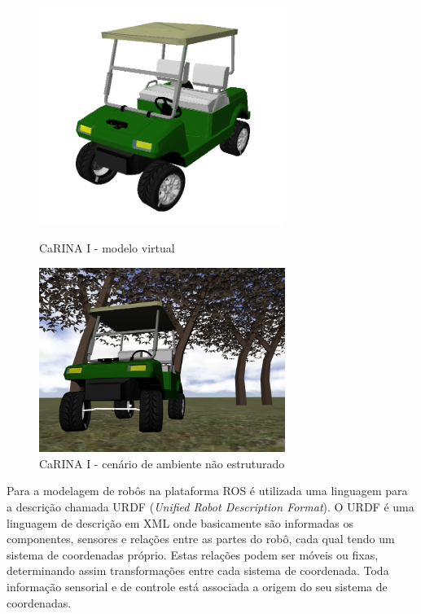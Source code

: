 \documentclass{article}
\begin{document}
\begin{figure}[ht]
	\begin{minipage}[b]{0.4\linewidth}
	    \centering
	    \includegraphics[width=8cm]{../images/carina_rviz_fundo_branco_sem_grid.png}
	 	\caption{CaRINA I - modelo virtual}
	 	\label{fig:model}
	\end{minipage}
	\hspace{1cm}
	\begin{minipage}[b]{0.4\linewidth}
	    \centering
	    \includegraphics[width=8cm]{../images/carina_gazebo_frente_fundo.png}
	 	\caption{CaRINA I - cenário de ambiente não estruturado}
	 	\label{fig:gazebo}
	\end{minipage}
\end{figure}

Para a modelagem de robôs na plataforma ROS é utilizada uma linguagem para a
descrição chamada URDF (\textit{Unified Robot Description Format}). O URDF é
uma linguagem de descrição em XML onde basicamente são informadas os componentes,
sensores e relações entre as partes do robô, cada qual tendo um sistema de
coordenadas próprio. Estas relações podem ser móveis ou fixas, determinando
assim transformações entre cada sistema de coordenada. Toda informação sensorial
e de controle está associada a origem do seu sistema de coordenadas.
\end{document}
